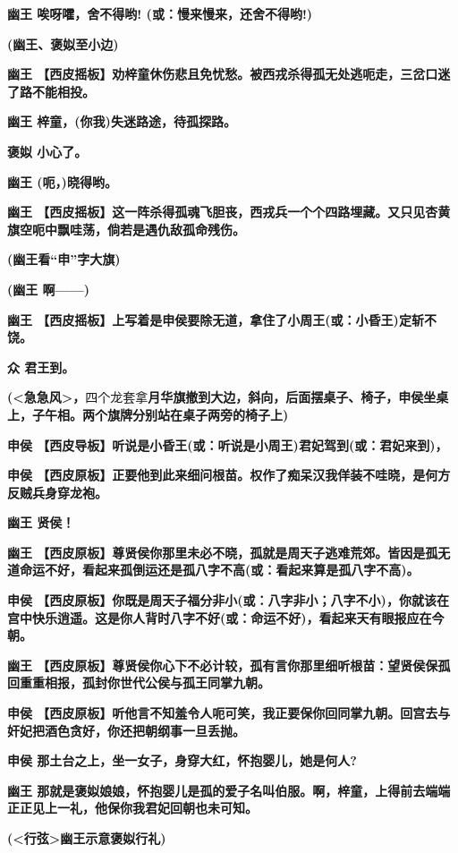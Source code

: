 \textbf{幽王 唉呀嚯，舍不得哟! (或：慢来慢来，还舍不得哟!)}

\textbf{(幽王、褒姒至小边)}

\textbf{幽王
【西皮摇板】劝梓童休伤悲且免忧愁。被西戎杀得孤无处逃呃走，三岔口迷了路不能相投。}

\textbf{幽王 梓童，(你我)失迷路途，待孤探路。}

\textbf{褒姒 小心了。}

\textbf{幽王 (呃，)晓得哟。}

\textbf{幽王
【西皮摇板】这一阵杀得孤魂飞胆丧，西戎兵一个个四路埋藏。又只见杏黄旗空呃中飘哇荡，倘若是遇仇敌孤命残伤。}

\textbf{(幽王看``申''字大旗)}

\textbf{(幽王 啊------)}

\textbf{幽王
【西皮摇板】上写着是申侯要除无道，拿住了小周王(或：小昏王)定斩不饶。}

\textbf{众 君王到。}

\textbf{(\textless{}急急风\textgreater{}，}四个龙套拿\textbf{月华旗撤到大边，斜向，后面摆桌子、椅子，申侯坐桌上，子午相。两个旗牌分别站在桌子两旁的椅子上)}

\textbf{申侯
【西皮导板】听说是小昏王(或：听说是小周王)君妃驾到(或：君妃来到)，}

\textbf{申侯
【西皮原板】正要他到此来细问根苗。权作了痴呆汉我佯装不哇晓，是何方反贼兵身穿龙袍。}

\textbf{幽王 贤侯！}

\textbf{幽王
【西皮原板】尊贤侯你那里未必不晓，孤就是周天子逃难荒郊。皆因是孤无道命运不好，看起来孤倒运还是孤八字不高(或：看起来算是孤八字不高)。}

\textbf{申侯
【西皮原板】你既是周天子福分非小(或：八字非小；八字不小)，你就该在宫中快乐逍遥。这是你人背时八字不好(或：命运不好)，看起来天有眼报应在今朝。}

\textbf{幽王
【西皮原板】尊贤侯你心下不必计较，孤有言你那里细听根苗：望贤侯保孤回重重相报，孤封你世代公侯与孤王同掌九朝。}

\textbf{申侯
【西皮原板】听他言不知羞令人呃可笑，我正要保你回同掌九朝。回宫去与奸妃把酒色贪好，你还把朝纲事一旦丢抛。}

\textbf{申侯 那土台之上，坐一女子，身穿大红，怀抱婴儿，她是何人?}

\textbf{幽王
那就是褒姒娘娘，怀抱婴儿是孤的爱子名叫伯服。啊，梓童，上得前去端端正正见上一礼，他保你我君妃回朝也未可知。}

\textbf{(\textless{}行弦\textgreater{}幽王示意褒姒行礼)}

